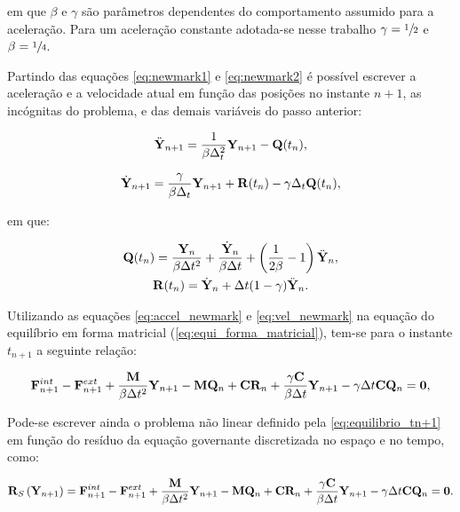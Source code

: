 \noindent em que $\beta$ e $\gamma$ são parâmetros dependentes do comportamento assumido para a aceleração. Para um aceleração constante adotada-se nesse trabalho $\gamma=\sfrac{1}{2}$ e $\beta=\sfrac{1}{4}$.

Partindo das equações \autoref{eq:newmark1} e \autoref{eq:newmark2} é possível escrever a aceleração e a velocidade atual em função das posições no instante $n+1$, as incógnitas do problema, e das demais variáveis do passo anterior:

\begin{align}
	\ddot{\mathbf{Y}}_{n+1} = \frac{1}{\beta \Delta_{t}^2}\mathbf{Y}_{n+1} - \mathbf{Q}(t_n), \label{eq:accel_newmark}
\end{align}

\begin{align}
	\dot{\mathbf{Y}}_{n+1} = \frac{\gamma}{\beta \Delta_{t}}\mathbf{Y}_{n+1} + \mathbf{R}(t_n) - \gamma \Delta_{t} \mathbf{Q}(t_n), \label{eq:vel_newmark}
\end{align}

\noindent em que:

\begin{gather}
	\mathbf{Q}(t_n) = \frac{\mathbf{Y}_n}{\beta \Delta t^2} + \frac{\dot{\mathbf{Y}}_n}{\beta \Delta t} + \left(\frac{1}{2\beta} -1 \right)\ddot{\mathbf{Y}}_n,\label{eq:Qn}\\
	\mathbf{R}(t_n) = \dot{\mathbf{Y}}_n+\Delta t(1-\gamma)\ddot{\mathbf{Y}}_n.\label{eq:Rn}
\end{gather}

Utilizando as equações \autoref{eq:accel_newmark} e \autoref{eq:vel_newmark} na equação do equilíbrio em forma matricial (\autoref{eq:equi_forma_matricial}), tem-se para o instante $t_{n+1}$ a seguinte relação:

\begin{gather}
	\mathbf{F}^{int}_{n+1}- \mathbf{F}^{ext}_{n+1} + \frac{\mathbf{M}}{\beta \Delta t^2} \mathbf{Y}_{n+1}-\mathbf{M} \mathbf{Q}_n+ \mathbf{C}\mathbf{R}_n + \frac{\gamma \mathbf{C}}{\beta \Delta t}\mathbf{Y}_{n+1} - \gamma\Delta t \mathbf{C}\mathbf{Q}_n = \mathbf{0},
	\label{eq:equilibrio_tn+1}
\end{gather}
  
Pode-se escrever ainda o problema não linear definido pela \autoref{eq:equilibrio_tn+1} em função do resíduo da equação governante
discretizada no espaço e no tempo, como:

\begin{gather}
\mathbf{R}_S\left(\mathbf{Y}_{n+1}\right) = \mathbf{F}^{int}_{n+1}- \mathbf{F}^{ext}_{n+1} + \frac{\mathbf{M}}{\beta \Delta t^2} \mathbf{Y}_{n+1}-\mathbf{M} \mathbf{Q}_n+ \mathbf{C}\mathbf{R}_n + \frac{\gamma \mathbf{C}}{\beta \Delta t}\mathbf{Y}_{n+1} - \gamma\Delta t \mathbf{C}\mathbf{Q}_n= \mathbf{0}.
\label{eq:residuo_equilibrio_newmark}
\end{gather}

